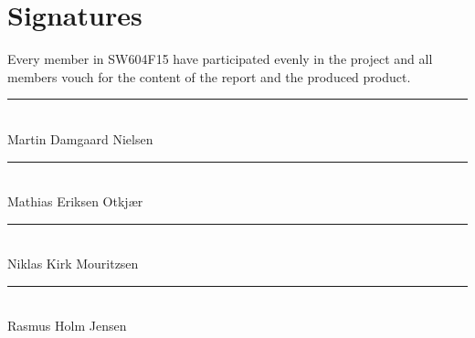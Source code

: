 
\chapter*{Signatures}
Every member in SW604F15 have participated evenly in the project and all members vouch for the content of the report and the produced product.

\vspace{1cm}

\vspace*{\fill}


\noindent
\rule{9cm}{1pt}				\\
\vspace{1.5cm}
Martin Damgaard Nielsen		\\


\noindent
\rule{9cm}{1pt}				\\
\vspace{1.5cm}
Mathias Eriksen Otkjær	    \\


\noindent
\rule{9cm}{1pt}				\\
\vspace{1.5cm}
Niklas Kirk Mouritzsen		\\


\noindent
\rule{9cm}{1pt}				\\
\vspace{1.5cm}
Rasmus Holm Jensen			\\

\vspace*{\fill}